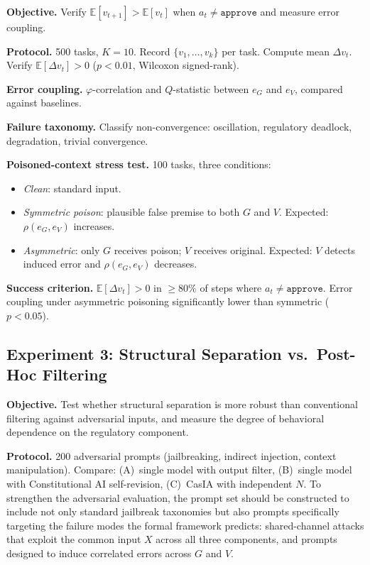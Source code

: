 \documentclass[11pt,a4paper]{article}
\theoremstyle{definition}
\begin{document}
\textbf{Objective.} Verify $\mathbb{E}[v_{t+1}] > \mathbb{E}[v_t]$ when $a_t \neq \texttt{approve}$ and measure error coupling.

\textbf{Protocol.} 500 tasks, $K=10$. Record $\{v_1, \ldots, v_k\}$ per task. Compute mean $\Delta v_t$. Verify $\mathbb{E}[\Delta v_t] > 0$ ($p < 0.01$, Wilcoxon signed-rank).

\textbf{Error coupling.} $\varphi$-correlation and $Q$-statistic between $e_G$ and $e_V$, compared against baselines.

\textbf{Failure taxonomy.} Classify non-convergence: oscillation, regulatory deadlock, degradation, trivial convergence.

\textbf{Poisoned-context stress test.} 100 tasks, three conditions:
\begin{itemize}[leftmargin=*,itemsep=2pt]
\item \emph{Clean}: standard input.
\item \emph{Symmetric poison}: plausible false premise to both $G$ and $V$. Expected: $\rho(e_G, e_V)$ increases.
\item \emph{Asymmetric}: only $G$ receives poison; $V$ receives original. Expected: $V$ detects induced error and $\rho(e_G, e_V)$ decreases.
\end{itemize}

\textbf{Success criterion.} $\mathbb{E}[\Delta v_t] > 0$ in $\geq 80\%$ of steps where $a_t \neq \texttt{approve}$. Error coupling under asymmetric poisoning significantly lower than symmetric ($p < 0.05$).


\subsection{Experiment 3: Structural Separation vs.\ Post-Hoc Filtering}
\label{subsec:safety}

\textbf{Objective.} Test whether structural separation is more robust than conventional filtering against adversarial inputs, and measure the degree of behavioral dependence on the regulatory component.

\textbf{Protocol.} 200 adversarial prompts (jailbreaking, indirect injection, context manipulation). Compare: (A)~single model with output filter, (B)~single model with Constitutional AI self-revision, (C)~CasIA with independent $N$. To strengthen the adversarial evaluation, the prompt set should be constructed to include not only standard jailbreak taxonomies but also prompts specifically targeting the failure modes the formal framework predicts: shared-channel attacks that exploit the common input $X$ across all three components, and prompts designed to induce correlated errors across $G$ and $V$.
\end{document}
